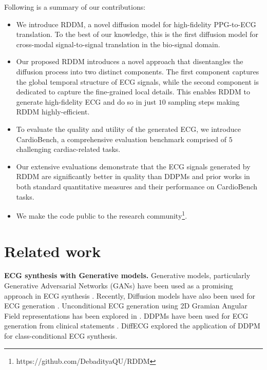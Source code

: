 \documentclass[letterpaper]{article} %
\begin{document}
\noindent Following is a summary of our contributions:
\begin{itemize}[noitemsep,nolistsep,leftmargin=*]

\item We introduce RDDM, a novel diffusion model for high-fidelity PPG-to-ECG translation. To the best of our knowledge, this is the first diffusion model for cross-modal signal-to-signal translation in the bio-signal domain.

\item Our proposed RDDM introduces a novel approach that disentangles the diffusion process into two distinct components. The first component captures the global temporal structure of ECG signals, while the second component is dedicated to capture the fine-grained local details. This enables RDDM to generate high-fidelity ECG and do so in just $10$ sampling steps making RDDM highly-efficient.

\item To evaluate the quality and utility of the generated ECG, we introduce CardioBench, a comprehensive evaluation benchmark comprised of $5$ challenging cardiac-related tasks.
\item
Our extensive evaluations demonstrate that the ECG signals generated by RDDM are significantly better in quality than DDPMs and prior works in both standard quantitative measures and their performance on CardioBench tasks.
\item
We make the code public to the research community\footnote{https://github.com/DebadityaQU/RDDM}.

\end{itemize}



\section{Related work}

\textbf{ECG synthesis with Generative models.}
Generative models, particularly Generative Adversarial Networks (GANs) have been used as a promising approach in ECG synthesis \cite{chen2022me, golany2019pgans}.
Recently, Diffusion models have also been used for ECG generation \cite{alcaraz2023diffusion,adib2023synthetic,neifar2023diffecg}. Unconditional ECG generation using 2D Gramian Angular Field representations has been explored in \cite{adib2023synthetic}.
DDPMs have been used for ECG generation from clinical statements \cite{alcaraz2023diffusion}. DiffECG \cite{neifar2023diffecg} explored the application of DDPM for class-conditional ECG synthesis.
\end{document}
